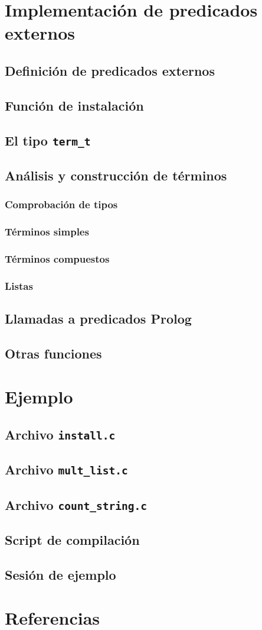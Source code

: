 \documentclass[a4paper]{article}
\begin{document}
\section{Implementación de predicados externos}
\subsection{Definición de predicados externos}
\subsection{Función de instalación}
\subsection{El tipo \texttt{term\_t}}
\subsection{Análisis y construcción de términos}
\subsubsection{Comprobación de tipos}
\subsubsection{Términos simples}
\subsubsection{Términos compuestos}
\subsubsection{Listas}
\subsection{Llamadas a predicados Prolog}
\subsection{Otras funciones}


\section{Ejemplo}
\subsection{Archivo \texttt{install.c}}
\subsection{Archivo  \texttt{mult\_list.c}}
\subsection{Archivo  \texttt{count\_string.c}}
\subsection{Script de compilación}
\subsection{Sesión de ejemplo}


\section{Referencias}
\end{document}
